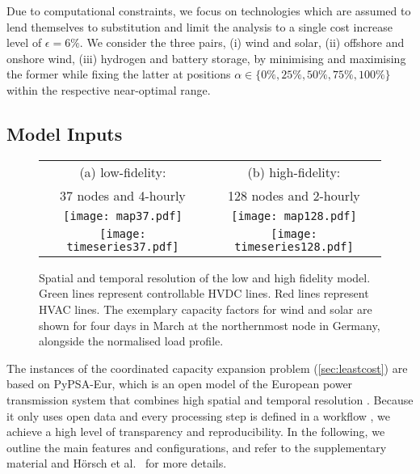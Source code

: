 Due to computational constraints, we focus on technologies which
are assumed to lend themselves to substitution and limit the analysis to a single
cost increase level of $\epsilon=6\%$.
We consider the three pairs,
(i) wind and solar,
(ii) offshore and onshore wind,
(iii) hydrogen and battery storage,
by minimising and maximising the former while
fixing the latter at positions $\alpha \in \{0\%,25\%,50\%,75\%,100\%\}$
within the respective near-optimal range.

\subsection{Model Inputs}
\label{sec:inputs}

\begin{SCfigure}
        \begin{tabular}{cc}
            \footnotesize (a) low-fidelity: & \footnotesize (b) high-fidelity: \\
            \footnotesize 37 nodes and 4-hourly & \footnotesize 128 nodes and 2-hourly \\
            \texttt{[image: map37.pdf]} &
            \texttt{[image: map128.pdf]} \\
            \texttt{[image: timeseries37.pdf]} &
            \texttt{[image: timeseries128.pdf]} \\
        \end{tabular}
    \caption[Spatial and temporal resolution of the low and high fidelity model]{Spatial and temporal resolution of the low and high fidelity model.
    Green lines represent controllable HVDC lines. Red lines represent HVAC lines.
    The exemplary capacity factors for wind and solar are shown for four days in March
    at the northernmost node in Germany, alongside the normalised load profile.}
    \label{fig:pypsaeur}
\end{SCfigure}


The instances of the coordinated capacity expansion problem (\cref{sec:leastcost})
 are based on \mbox{PyPSA-Eur},
which is an open model of the European power transmission system
that combines high spatial and temporal resolution \cite{pypsaeur}.
Because it only uses open data
and every processing step is defined in a workflow \cite{snakemake},
we achieve a high level of transparency and reproducibility.
In the following, we outline the main features and configurations, and
refer to the supplementary material and Hörsch et al.~\cite{pypsaeur} for more details.

